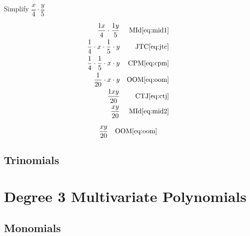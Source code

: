 \begin{example}[id:20141108-180858] \label{20141108-180858}  \hfill \\

Simplify $\dfrac{x}{4} \cdot \dfrac{y}{5}$

\soln

\solnsteps
\begin{align*}
\dfrac{1x}{4} \cdot \dfrac{1y}{5} && \text{MId} \eqref{eq:mid1} \\ 
\dfrac{1}{4} \cdot x \cdot \dfrac{1}{5} \cdot y && \text{JTC} \eqref{eq:jtc} \\
\dfrac{1}{4} \cdot \dfrac{1}{5} \cdot x \cdot y && \text{CPM} \eqref{eq:cpm} \\
\dfrac{1}{20} \cdot x \cdot y && \text{OOM} \eqref{eq:oom} \\
\dfrac{1xy}{20} && \text{CTJ} \eqref{eq:ctj} \\
\dfrac{xy}{20} && \text{MId} \eqref{eq:mid2} 
\end{align*}

\soln

\lesssteps
\begin{align*}
\dfrac{xy}{20} && \text{OOM} \eqref{eq:oom} 
\end{align*}
\end{example}


\subsection*{Trinomials}

\section*{Degree 3 Multivariate Polynomials}

\subsection*{Monomials}

